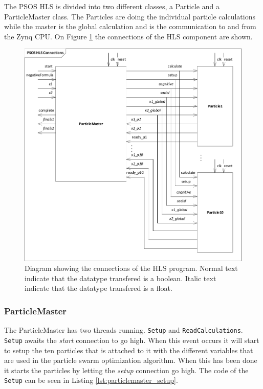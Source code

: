 The PSOS HLS is divided into two different classes, a Particle and a ParticleMaster class. The Particles are doing the individual particle calculations while the master is the global calculation and is the communication to and from the Zynq CPU. On Figure \ref{fig:psoshlsconnections} the connections of the HLS component are shown.\\

\begin{figure}[H]
	\centering
	\includegraphics[width=0.7\linewidth]{diagram/psos_hls_connections}
	\caption{Diagram showing the connections of the HLS program. Normal text indicate that the datatype transfered is a boolean. Italic text indicate that the datatype transfered is a float.}
	\label{fig:psoshlsconnections}
\end{figure}

\subsubsection{ParticleMaster}

The ParticleMaster has two threads running. \texttt{Setup} and \texttt{ReadCalculations}. \texttt{Setup} awaits the \textit{start} connection to go high. When this event occurs it will start to setup the ten particles that is attached to it with the different variables that are used in the particle swarm optimization algorithm. When this has been done it starts the particles by letting the \textit{setup} connection go high. The code of the \texttt{Setup} can be seen in Listing \ref{lst:particlemaster_setup}.\\


